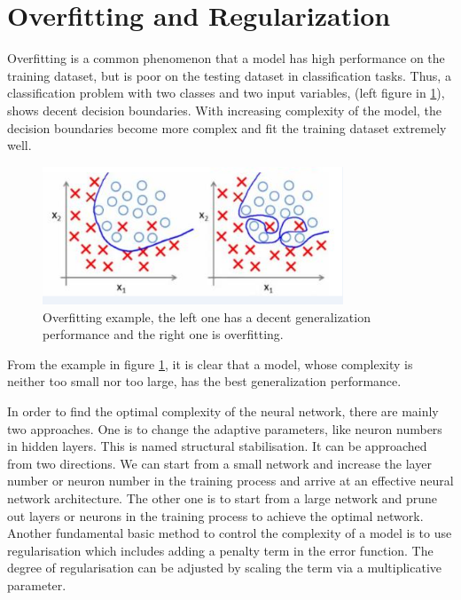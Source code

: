 \section{Overfitting and Regularization}

Overfitting is a common phenomenon that a model has high performance on the training dataset, but is poor on the testing dataset in classification tasks. Thus, a classification problem with two classes and two input variables, (left figure in \ref{fig:OverfittingExample}), shows decent decision boundaries. With increasing complexity of the model, the decision boundaries become more complex and fit the training dataset extremely well.
\graphicspath{ {./Figures/} }
\begin{figure}[!htb]
\centering
\includegraphics[width=0.8\textwidth]{overfitting.png}
\caption{\label{fig:OverfittingExample}Overfitting example, the left one has a decent generalization performance and the right one is overfitting.}
\end{figure}
From the example in figure \ref{fig:OverfittingExample}, it is clear that a model, whose complexity is neither too small nor too large, has the best generalization performance. 

In order to find the optimal complexity of the neural network, there are mainly two approaches. One is to change the adaptive parameters, like neuron numbers in hidden layers. This is named structural stabilisation. It can be approached from two directions. We can start from a small network and increase the layer number or neuron number in the training process and arrive at an effective neural network architecture. The other one is to start from a large network and prune out layers or neurons in the training process to achieve the optimal network. Another fundamental basic method to control the complexity of a model is to use regularisation which includes adding a penalty term in the error function. The degree of regularisation can be adjusted by scaling the term via a multiplicative parameter.

